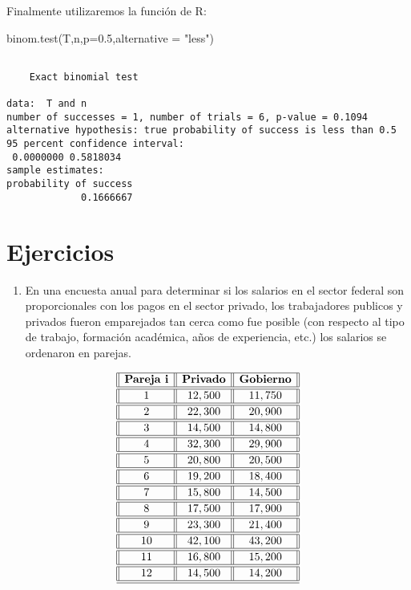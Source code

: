 \documentclass[
  a4paper,
  oneside,
  openany]{book}
\newenvironment{Shaded}{\begin{snugshade}}{\end{snugshade}}
\newcommand{\AttributeTok}[1]{\textcolor[rgb]{0.77,0.63,0.00}{#1}}
\newcommand{\FloatTok}[1]{\textcolor[rgb]{0.00,0.00,0.81}{#1}}
\newcommand{\FunctionTok}[1]{\textcolor[rgb]{0.00,0.00,0.00}{#1}}
\newcommand{\NormalTok}[1]{#1}
\newcommand{\StringTok}[1]{\textcolor[rgb]{0.31,0.60,0.02}{#1}}
\providecommand{\tightlist}{%
  \setlength{\itemsep}{0pt}\setlength{\parskip}{0pt}}
\begin{document}
Finalmente utilizaremos la función de R:

\begin{Shaded}
\begin{Highlighting}[]
\FunctionTok{binom.test}\NormalTok{(T,n,}\AttributeTok{p=}\FloatTok{0.5}\NormalTok{,}\AttributeTok{alternative =} \StringTok{"less"}\NormalTok{)}
\end{Highlighting}
\end{Shaded}

\begin{verbatim}

    Exact binomial test

data:  T and n
number of successes = 1, number of trials = 6, p-value = 0.1094
alternative hypothesis: true probability of success is less than 0.5
95 percent confidence interval:
 0.0000000 0.5818034
sample estimates:
probability of success 
             0.1666667 
\end{verbatim}

\hypertarget{ejercicios-2}{%
\section{Ejercicios}\label{ejercicios-2}}

\begin{enumerate}
\def\labelenumi{\arabic{enumi}.}
\tightlist
\item
  En una encuesta anual para determinar si los salarios en el sector federal son proporcionales con los pagos en el sector privado, los trabajadores publicos y privados fueron emparejados tan cerca como fue posible (con respecto al tipo de trabajo, formación académica, años de experiencia, etc.) los salarios se ordenaron en parejas.
\end{enumerate}

\[
\begin{array}{||c| |c| |c||} 
\hline 
\textbf{Pareja i}  & \textbf{Privado} & \textbf{Gobierno} \\ 
\hline
\hline
1 &12,500& 11,750 \\
\hline
\hline
2& 22,300 &20,900 \\
\hline
\hline
3 &14,500 &14,800 \\
\hline
\hline
4 &32,300 &29,900 \\
\hline
\hline
5 &20,800 &20,500 \\
\hline
\hline
6 &19,200 &18,400 \\
\hline
\hline
7 &15,800 &14,500 \\
\hline
\hline
8 &17,500 &17,900 \\
\hline
\hline
9 &23,300 &21,400 \\
\hline
\hline
10 &42,100 &43,200 \\
\hline
\hline
11 &16,800 &15,200 \\
\hline
\hline
12& 14,500 &14,200 \\
\hline
\hline
\end{array}
\]
\end{document}
